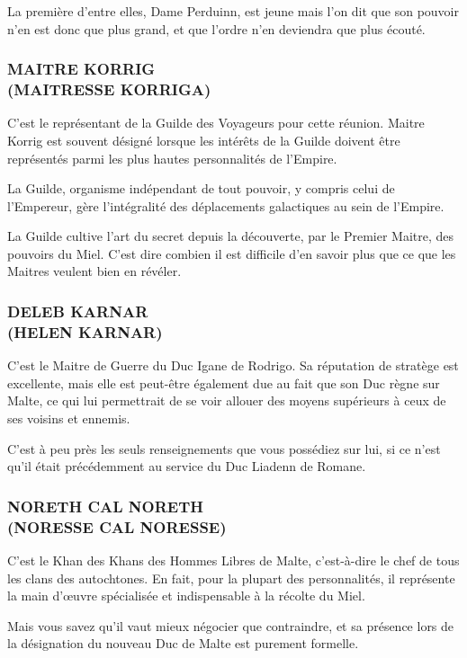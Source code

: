 \documentclass[14pt,twocolumn]{extarticle}
\begin{document}
La première d'entre elles, Dame Perduinn, est jeune mais l'on dit que son
pouvoir n'en est donc que plus grand, et que l'ordre n'en deviendra que plus
écouté.

\subsubsection{MAITRE KORRIG\\(MAITRESSE KORRIGA)}

C'est le représentant de la Guilde des Voyageurs pour cette réunion. Maitre
Korrig est souvent désigné lorsque les intérêts de la Guilde doivent être
représentés parmi les plus hautes personnalités de l'Empire.

La Guilde, organisme indépendant de tout pouvoir, y compris celui de
l'Empereur, gère l'intégralité des déplacements galactiques au sein de
l'Empire.

La Guilde cultive l'art du secret depuis la découverte, par le Premier Maitre,
des pouvoirs du Miel. C'est dire combien il est difficile d'en savoir plus que
ce que les Maitres veulent bien en révéler.

\subsubsection{DELEB KARNAR\\(HELEN KARNAR)}

C'est le Maitre de Guerre du Duc Igane de Rodrigo. Sa réputation de stratège
est excellente, mais elle est peut-être également due au fait que son Duc règne
sur Malte, ce qui lui permettrait de se voir allouer des moyens supérieurs à
ceux de ses voisins et ennemis.

C'est à peu près les seuls renseignements que vous possédiez sur lui, si ce
n'est qu'il était précédemment au service du Duc Liadenn de Romane.

\subsubsection{NORETH CAL NORETH\\(NORESSE CAL NORESSE)}

C'est le Khan des Khans des Hommes Libres de Malte, c'est-à-dire le chef de
tous les clans des autochtones. En fait, pour la plupart des personnalités, il
représente la main d'\oe{}uvre spécialisée et indispensable à la récolte du
Miel.

Mais vous savez qu'il vaut mieux négocier que contraindre, et sa présence lors
de la désignation du nouveau Duc de Malte est purement formelle.
\end{document}

